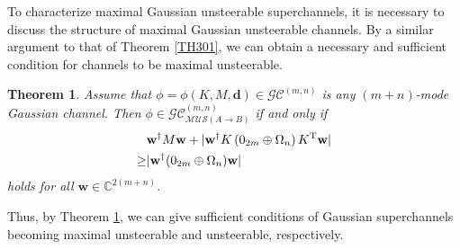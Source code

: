 \documentclass[10pt,aps,pra,amsfonts,amssymb,amsmath,%
floatfix,nofootinbib, groupedaddress,superscriptaddress,citesort,twocolumn
]{revtex4}%
\newtheorem{theorem}{Theorem}
\begin{document}
 
 

	

To characterize maximal Gaussian unsteerable superchannels, it is necessary to discuss the structure of
maximal Gaussian unsteerable channels.
By a similar argument to that of Theorem \ref{TH301},  we can obtain a necessary and sufficient condition for channels to be maximal unsteerable.


\begin{theorem}  \label{TH300}  Assume that  $\phi =\phi\left( {K,M,\mathbf d} \right) \in {\mathcal {GC}}^{\left(m,n \right)}$ is any $(m+n)$-mode Gaussian channel.
	Then   $\phi  \in	{\mathcal {GC}}^{(m,n)}_{\mathcal {MUS}(A \rightarrow B)}$ if and only if
\begin{equation} \label{N51}
\begin{aligned}
	&\mathbf{w}^{\dag}M\mathbf{w} +|\mathbf{w}^{\dag}K\left( 0_{2m} \oplus \Omega _n \right){K^{\rm T}}\mathbf{w}| \\
	\ge& |\mathbf{w}^{\dag}({0_{2m}} \oplus {\Omega _n})\mathbf{w}|
\end{aligned}	
\end{equation}
holds for  all $\mathbf{w} \in \mathbb{C}^{2(m+n)}$.
\end{theorem}	





Thus, by Theorem
\ref{TH300},  we can give sufficient conditions of Gaussian superchannels becoming maximal unsteerable and unsteerable, respectively.
\end{document}
